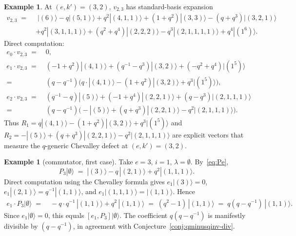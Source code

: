 \documentclass[11pt]{article}
\theoremstyle{definition}
\newtheorem{example}[theorem]{Example}
\begin{document}
\begin{example} \label{ex:R-32}
At $(e, k') = (3, 2)$, $v_{2,3}$ has standard-basis expansion
\begin{align*}
    v_{2,3} \;=\;&\; |(6)\rangle - q |(5,1)\rangle + q^2 |(4,1,1)\rangle
        + (1 + q^2) |(3,3)\rangle - (q + q^3) |(3,2,1)\rangle \\
        &+ q^2 |(3,1,1,1)\rangle + (q^2 + q^4) |(2,2,2)\rangle
        - q^3 |(2,1,1,1,1)\rangle + q^4 |(1^6)\rangle.
\end{align*}
Direct computation:
\begin{align*}
    e_0 \cdot v_{2,3} \;=&\; 0, \\
    e_1 \cdot v_{2,3} \;=&\; (-1 + q^2) |(4,1)\rangle + (q^{-1} - q^3) |(3,2)\rangle + (-q^2 + q^4) |(1^5)\rangle \\
    =&\; (q - q^{-1}) \bigl( q \cdot |(4,1)\rangle - (1 + q^2) |(3,2)\rangle + q^3 |(1^5)\rangle \bigr), \\
    e_2 \cdot v_{2,3} \;=&\; (q^{-1} - q) |(5)\rangle + (-1 + q^4) |(2,2,1)\rangle + (q - q^3) |(2,1,1,1)\rangle \\
    =&\; (q - q^{-1}) \bigl( -|(5)\rangle + (q + q^3) |(2,2,1)\rangle - q^2 |(2,1,1,1)\rangle \bigr).
\end{align*}
Thus $R_1 = q|(4,1)\rangle - (1+q^2)|(3,2)\rangle + q^3 |(1^5)\rangle$
and $R_2 = -|(5)\rangle + (q+q^3)|(2,2,1)\rangle - q^2 |(2,1,1,1)\rangle$
are explicit vectors that measure the $q$-generic Chevalley defect at
$(e, k') = (3, 2)$.
\end{example}

\begin{example}[commutator, first case] \label{ex:comm-P3-empty}
Take $e = 3$, $i = 1$, $\lambda = \emptyset$. By~\eqref{eq:Pe},
\[
    P_3 |\emptyset\rangle \;=\; |(3)\rangle - q\,|(2,1)\rangle + q^2 |(1,1,1)\rangle.
\]
Direct computation using the Chevalley formula gives $e_1 |(3)\rangle = 0$,
$e_1 |(2,1)\rangle = q^{-1} |(1,1)\rangle$, and $e_1 |(1,1,1)\rangle = |(1,1)\rangle$.
Hence
\begin{align*}
    e_1 \cdot P_3 |\emptyset\rangle \;=&\; -q \cdot q^{-1} \,|(1,1)\rangle + q^2 \,|(1,1)\rangle
        \;=\; (q^2 - 1)\, |(1,1)\rangle
        \;=\; q(q - q^{-1})\, |(1,1)\rangle.
\end{align*}
Since $e_1 |\emptyset\rangle = 0$, this equals $[e_1, P_3]|\emptyset\rangle$.
The coefficient $q(q - q^{-1})$ is manifestly divisible by $(q - q^{-1})$, in
agreement with Conjecture~\ref{conj:qminusqinv-div}.
\end{example}
\end{document}
